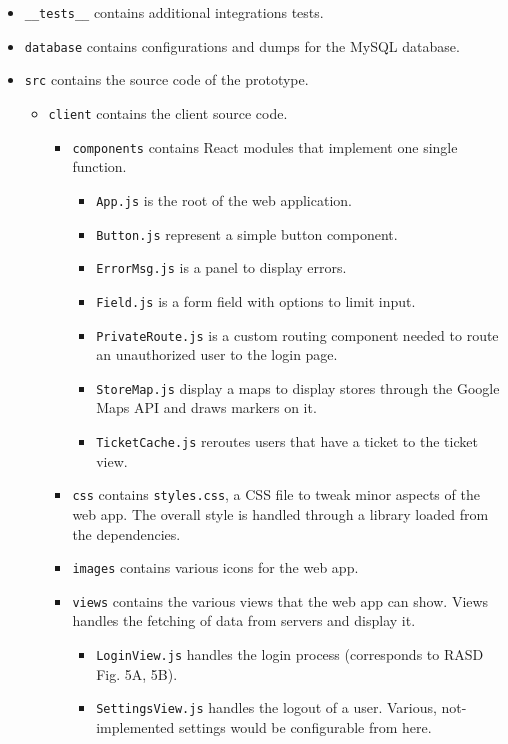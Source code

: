 \documentclass[
]{article}
\begin{document}
\begin{itemize}
  \item \texttt{\_\_tests\_\_} contains additional integrations tests.
  \item \texttt{database} contains configurations and dumps for the MySQL database.
  \item \texttt{src} contains the source code of the prototype.
  \begin{itemize}
    \item \texttt{client} contains the client source code.
    \begin{itemize}
      \item \texttt{components} contains React modules that implement one single function.
      \begin{itemize}
        \item \texttt{App.js} is the root of the web application.
        \item \texttt{Button.js} represent a simple button component.
        \item \texttt{ErrorMsg.js} is a panel to display errors.
        \item \texttt{Field.js} is a form field with options to limit input.
        \item \texttt{PrivateRoute.js} is a custom routing component needed to route an unauthorized user to the login page.
        \item \texttt{StoreMap.js} display a maps to display stores through the Google Maps API and draws markers on it.
        \item \texttt{TicketCache.js} reroutes users that have a ticket to the ticket view.
      \end{itemize}
      \item \texttt{css} contains \texttt{styles.css}, a CSS file to tweak minor aspects of the web app. The overall style is handled through a library loaded from the dependencies.
      \item \texttt{images} contains various icons for the web app.
      \item \texttt{views} contains the various views that the web app can show. Views handles the fetching of data from servers and display it.
      \begin{itemize}
        \item \texttt{LoginView.js} handles the login process (corresponds to RASD Fig. 5A, 5B).
        \item \texttt{SettingsView.js} handles the logout of a user. Various, not-implemented settings would be configurable from here.

\end{itemize}
\end{itemize}
\end{itemize}
\end{itemize}
\end{document}
